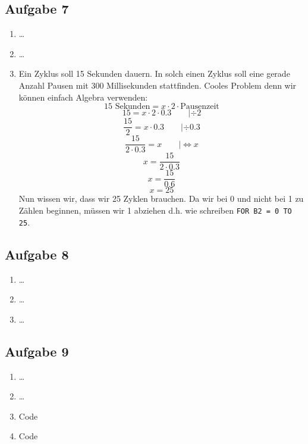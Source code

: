 \subsection{Aufgabe 7}
\begin{enumerate}[label=(\alph*)]
\item \dots
\item \dots 
\item Ein Zyklus soll 15 Sekunden dauern. In solch einen Zyklus soll eine gerade
Anzahl Pausen mit 300 Millisekunden stattfinden. Cooles Problem denn wir können 
einfach Algebra verwenden:
\[  \text{15 Sekunden} = x \cdot 2 \cdot \text{Pausenzeit} \]
\[  15 = x \cdot 2 \cdot 0.3 \qquad |\div 2 \]
\[  \frac{15}{2} = x \cdot 0.3 \qquad |\div 0.3 \]
\[ \frac{15}{2 \cdot 0.3} = x  \qquad |\Leftrightarrow x \]
\[ x = \frac{15}{2 \cdot 0.3} \]
\[ x = \frac{15}{0.6} \]
\[ x = 25 \]
Nun wissen wir, dass wir 25 Zyklen brauchen. Da wir bei 0 und nicht bei 1 zu Zählen 
beginnen, müssen wir 1 abziehen d.h. wie schreiben \lstinline{FOR B2 = 0 TO 25}.

\end{enumerate}
\fi

\ifteacher
\newpage
\subsection{Aufgabe 8}
\begin{enumerate}[label=(\alph*)]
\item \dots
\item \dots
\item \dots
\end{enumerate}
\fi

\ifteacher
\newpage
\subsection{Aufgabe 9}
\begin{enumerate}[label=(\alph*)]
\item \dots
\item \dots
\item Code \\ 
\item Code \\ 
\end{enumerate}
\fi